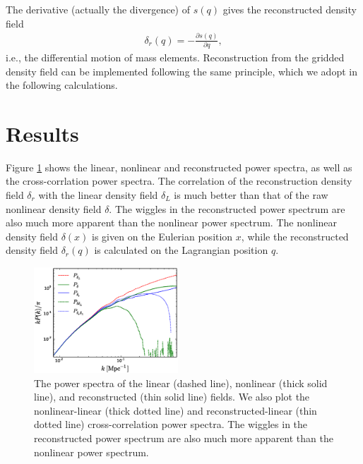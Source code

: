 \documentclass[aps,prd,twocolumn,showpacs,superscriptaddress,groupedaddress,nofootinbib]{revtex4}  %
\newcommand{\tcb}{\textcolor{blue}}
\newcommand{\bea}{\begin{eqnarray}}
\newcommand{\eea}{\end{eqnarray}}
\begin{document}
The derivative (actually the divergence) of $s(q)$ gives the reconstructed 
density field 
\bea
\delta_r({q})=-\frac{\partial s(q)}{\partial q},
\eea
i.e., the differential motion of mass elements. 
Reconstruction from the gridded density field can be implemented following
the same principle, which we adopt in the following calculations.


\section{Results}
\label{res}
Figure \ref{fig:ps} shows the linear, nonlinear and reconstructed power spectra,
as well as the cross-corrlation power spectra.
The correlation of the reconstruction density field $\delta_r$ with the linear
density field $\delta_L$ is much better than that of the raw nonlinear density 
field $\delta$. The wiggles in the reconstructed power spectrum are also much 
more apparent than the nonlinear power spectrum.
The nonlinear density field $\delta(x)$ is given on the Eulerian position $x$,
while the reconstructed density field $\delta_r(q)$ is calculated on the 
Lagrangian position $q$. 

\begin{figure}[tbp]
\begin{center}
\includegraphics[width=0.48\textwidth]{f3x.eps}
\end{center}
\vspace{-0.7cm}
\caption{The power spectra of the linear (dashed line), nonlinear (thick solid
line), and reconstructed (thin solid line) fields. 
We also plot the nonlinear-linear (thick dotted line) and 
reconstructed-linear (thin dotted line) cross-correlation power spectra.
The wiggles in the reconstructed power spectrum are also much 
more apparent than the nonlinear power spectrum.}
\label{fig:ps}
\end{figure}
\end{document}
